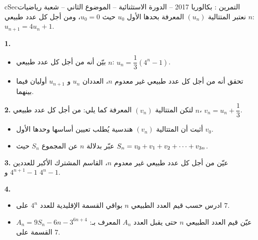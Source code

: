 \documentclass[12pt,a4paper]{article}
\newenvironment{BOX}[2]{\begin{otherlanguage}{english}\begin{arbox}{#1}{#2}}{\end{arbox}\end{otherlanguage}}
\newcounter{exo}
\newenvironment{tamrin}[1]{\stepcounter{exo}\begin{BOX}{cSec}{التمرين \theexo: #1}}{\end{BOX}}
\renewcommand{\cdots}{\mathinner{\cdotp\cdotp\cdotp}}
\newenvironment{sq}{\begin{itemize}[leftmargin=2.4em,itemsep=3pt]}{\end{itemize}}
\newcommand{\qa}{\item[(أ)]}\newcommand{\qb}{\item[(ب)]}\newcommand{\qc}{\item[(جـ)]}\newcommand{\qd}{\item[(د)]}\newcommand{\qe}{\item[(هـ)]}
\begin{document}
\begin{tamrin}{بكالوريا 2017 -- الدورة الاستثنائية -- الموضوع الثاني -- شعبة رياضيات}
نعتبر المتتالية $(u_n)$ المعرفة بحدها الأول $u_0$ حيث $u_0=0$، ومن أجل كل عدد طبيعي $n$: $u_{n+1}=4u_n+1$.

\textbf{1.}
\begin{sq}
\qa بيّن أنه من أجل كل عدد طبيعي $n$: $u_n=\dfrac13\left(4^n-1\right)$.
\qb تحقق أنه من أجل كل عدد طبيعي غير معدوم $n$، العددان $u_n$ و $u_{n+1}$ أوليان فيما بينهما.
\end{sq}
\textbf{2.} لتكن المتتالية $(v_n)$ المعرفة كما يلي: من أجل كل عدد طبيعي $n$، $v_n=u_n+\dfrac13$.
\begin{sq}
\qa أثبت أن المتتالية $(v_n)$ هندسية يُطلب تعيين أساسها وحدها الأول $v_0$.
\qb عبّر بدلالة $n$ عن المجموع $S_n$ حيث $S_n=v_0+v_1+v_2+\cdots+v_{3n}$.
\end{sq}
\textbf{3.} عيّن من أجل كل عدد طبيعي غير معدوم $n$، القاسم المشترك الأكبر للعددين $4^{n+1}-1$ و $4^n-1$.

\textbf{4.}
\begin{sq}
\qa ادرس حسب قيم العدد الطبيعي $n$ بواقي القسمة الإقليدية للعدد $4^n$ على $7$.
\qb عيّن قيم العدد الطبيعي $n$ حتى يقبل العدد $A_n$ المعرف بـ: $A_n=9S_n-6n-3^{6n+4}$ القسمة على $7$.
\end{sq}
\end{tamrin}
\end{document}
